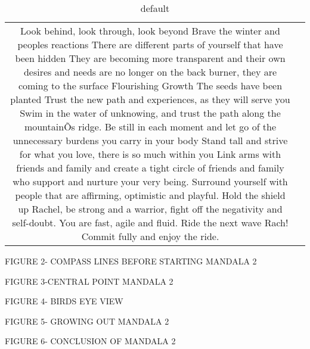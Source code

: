 \begin{table}[htp]
\caption{default}
\begin{center}
\begin{tabular}{|c|c|}
Look behind, look through, look beyond
Brave the winter and peoples reactions
There are different parts of yourself that have been hidden
They are becoming more transparent and their own desires and needs are no longer on the back burner, they are coming to the surface
Flourishing 
Growth
The seeds have been planted
Trust the new path and experiences, as they will serve you
Swim in the water of unknowing, and trust the path along the mountainÕs ridge. 
Be still in each moment and let go of the unnecessary burdens you carry in your body
Stand tall and strive for what you love, there is so much within you
Link arms with friends and family and create a tight circle of friends and family who support and nurture your very being. 
Surround yourself with people that are affirming, optimistic and playful. 
Hold the shield up Rachel, be strong and a warrior, fight off the negativity and self-doubt. You are fast, agile and fluid. 
Ride the next wave Rach! Commit fully and enjoy the ride.
\end{tabular}
\end{center}
\label{default}
\end{table}%


FIGURE 2- COMPASS LINES BEFORE STARTING MANDALA 2


FIGURE 3-CENTRAL POINT MANDALA 2

FIGURE 4- BIRDS EYE VIEW

FIGURE 5- GROWING OUT MANDALA 2

FIGURE 6- CONCLUSION OF MANDALA 2

